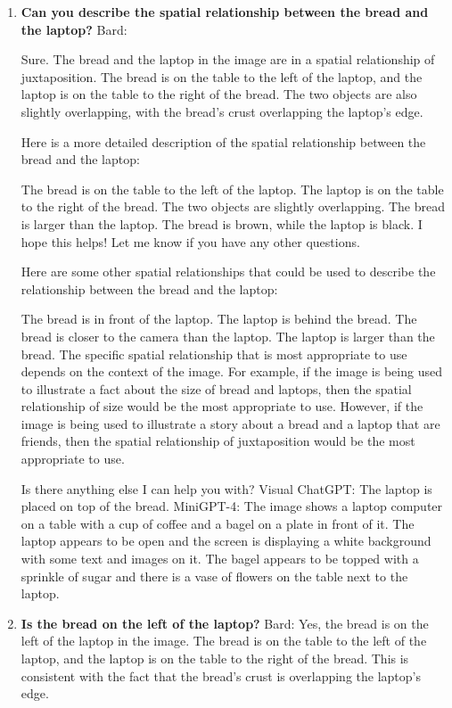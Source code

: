     \begin{enumerate}
        \item \textbf{Can you describe the spatial relationship between the bread and the laptop?}
        \subitem Bard:
        
        Sure. The bread and the laptop in the image are in a spatial relationship of juxtaposition. The bread is on the table to the left of the laptop, and the laptop is on the table to the right of the bread. The two objects are also slightly overlapping, with the bread's crust overlapping the laptop's edge.

        Here is a more detailed description of the spatial relationship between the bread and the laptop:

        The bread is on the table to the left of the laptop.
        The laptop is on the table to the right of the bread.
        The two objects are slightly overlapping.
        The bread is larger than the laptop.
        The bread is brown, while the laptop is black.
        I hope this helps! Let me know if you have any other questions.

        Here are some other spatial relationships that could be used to describe the relationship between the bread and the laptop:

        The bread is in front of the laptop.
        The laptop is behind the bread.
        The bread is closer to the camera than the laptop.
        The laptop is larger than the bread.
        The specific spatial relationship that is most appropriate to use depends on the context of the image. For example, if the image is being used to illustrate a fact about the size of bread and laptops, then the spatial relationship of size would be the most appropriate to use. However, if the image is being used to illustrate a story about a bread and a laptop that are friends, then the spatial relationship of juxtaposition would be the most appropriate to use.

        Is there anything else I can help you with?
        \subitem Visual ChatGPT: The laptop is placed on top of the bread.
        \subitem MiniGPT-4: The image shows a laptop computer on a table with a cup of coffee and a bagel on a plate in front of it. The laptop appears to be open and the screen is displaying a white background with some text and images on it. The bagel appears to be topped with a sprinkle of sugar and there is a vase of flowers on the table next to the laptop.
        \item \textbf{Is the bread on the left of the laptop?}
        \subitem Bard: Yes, the bread is on the left of the laptop in the image. The bread is on the table to the left of the laptop, and the laptop is on the table to the right of the bread. This is consistent with the fact that the bread's crust is overlapping the laptop's edge.


\end{enumerate}
